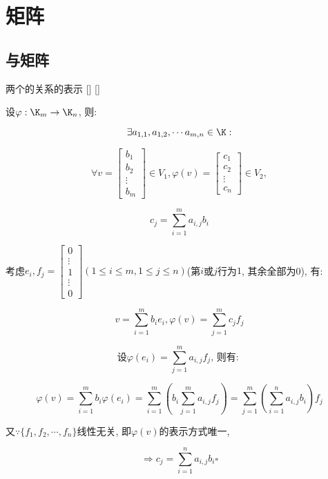 \documentclass[UTF8]{ctexart}
\begin{document}
\section{矩阵}
	
	\subsection{ 与矩阵}
		\begin{thm}
			[]
			{两个 的关系的表示}
			[]
			[]

			设$\varphi:\K_m\to \K_n$, 则: 
			
			$$\exists a_{1,1},a_{1,2},\cdots a_{m,n}\in\K: $$
			
			$$\forall v=\begin{bmatrix}b_1\\b_2\\\vdots\\b_m\end{bmatrix}\in V_1, \varphi(v)=\begin{bmatrix}c_1\\c_2\\\vdots\\c_n\end{bmatrix}\in V_2, $$
			
			$$c_j=\sum_{i=1}^{m}a_{i,j}b_i$$
		\end{thm}
  
		\begin{prf}
			考虑$e_i,f_j=\begin{bmatrix}0\\\vdots\\1\\\vdots\\0\end{bmatrix}(1\leq i\leq m, 1\leq j\leq n)$(第$i$或$j$行为$1$, 其余全部为0), 有: 
			
			$$v=\sum_{i=1}^{m}b_{i}e_i, \varphi(v)=\sum_{j=1}^{m}c_{j}f_j$$
			
			$$\mbox{设}\varphi(e_i)=\sum_{j=1}^{m}a_{i,j}f_j\mbox{, 则有: }$$
			
			$$\varphi(v)=\sum_{i=1}^{m}b_{i}\varphi(e_i)=\sum_{i=1}^{m}(b_{i}\sum_{j=1}^{m}a_{i,j}f_j)=\sum_{j=1}^{m}(\sum_{i=1}^{n}a_{i,j}b_i)f_j$$
			
			又$\because\{f_1,f_2,\cdots,f_n\}$线性无关, 即$\varphi(v)$的表示方式唯一, 
			
			$$\Longrightarrow c_j=\sum_{i=1}^{n}a_{i,j}b_i\square$$
		\end{prf}
  
\end{document}
